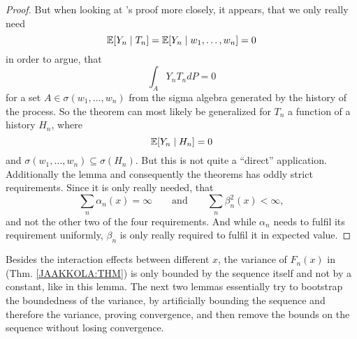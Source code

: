\begin{proof}
    But when looking at \citeauthor{dvoretzkyStochasticApproximation1956}'s proof more closely, it appears, that we only really need
    \[
        \mathbb{E}[Y_n \mid T_n]=\mathbb{E}[Y_n \mid w_1,\dots,w_n]=0
    \]
    in order to argue, that 
    \[
        \int_A Y_n T_n dP =0
    \]
    for a set \(A\in\sigma(w_1,\dots,w_n)\) from the sigma algebra generated by the history of the process. So the theorem can most likely be generalized for \(T_n\) a function of a history \(H_n\), where
    \[
        \mathbb{E}[Y_n \mid H_n]=0
    \]
    and \(\sigma(w_1,\dots,w_n)\subseteq \sigma(H_n)\). But this is not quite a ``direct'' application. Additionally the lemma and consequently the theorems has oddly strict requirements. Since it is only really needed, that 
    \[
        \sum_n \alpha_n(x)=\infty \qquad \text{and} \qquad \sum_n \beta_n^2(x) < \infty,
    \]
    and not the other two of the four requirements. And while \(\alpha_n\) needs to fulfil its requirement uniformly, \(\beta_n\) is only really required to fulfil it in expected value. 
\end{proof}

Besides the interaction effects between different \(x\), the variance of \(F_n(x)\) in (Thm. \ref{JAAKKOLA:THM}) is only bounded by the sequence itself and not by a constant, like in this lemma. The next two lemmas essentially try to bootstrap the boundedness of the variance, by artificially bounding the sequence and therefore the variance, proving convergence, and then remove the bounds on the sequence without losing convergence.

